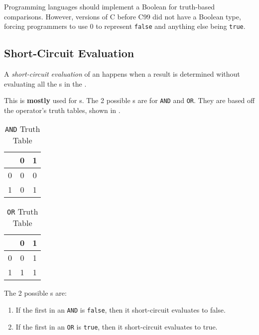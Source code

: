 Programming languages should implement a Boolean  for truth-based comparisons.
However, versions of C before C99 did not have a Boolean type, forcing programmers to use 0 to represent \texttt{false} and anything else being \texttt{true}.

\subsection{Short-Circuit Evaluation}\label{subsec:Short_Circuit_Evaluation}
\begin{definition}\label{def:Short_Circuit_Evaluation}
  A \emph{short-circuit evaluation} of an  happens when a result is determined without evaluating all the s in the .
\end{definition}

This is \textbf{mostly} used for s.
The 2 possible s are for \texttt{AND} and \texttt{OR}.
They are based off the operator's truth tables, shown in .

\begin{table}[h!]
  \centering
  \begin{tabular}{|c|cc|}
    \toprule
    & 0 & 1 \\
    \midrule
    0 & 0 & 0 \\
    1 & 0 & 1 \\
    \bottomrule
  \end{tabular}
  \caption{\texttt{AND} Truth Table}
  \label{tab:AND_Truth_Table}
\end{table}

\begin{table}[h!]
  \centering
  \begin{tabular}{|c|cc|}
    \toprule
    & 0 & 1 \\
    \midrule
    0 & 0 & 1 \\
    1 & 1 & 1 \\
    \bottomrule
  \end{tabular}
  \caption{\texttt{OR} Truth Table}
  \label{tab:OR_Truth_Table}
\end{table}

The 2 possible s are:
\begin{enumerate}[noitemsep]
\item If the first  in an \texttt{AND}  is \texttt{false}, then it short-circuit evaluates to false.
\item If the first  in an \texttt{OR}  is \texttt{true}, then it short-circuit evaluates to true.
\end{enumerate}

